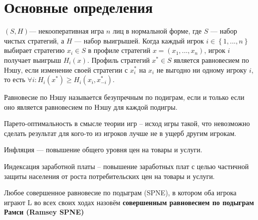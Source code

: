 \section{Основные определения}

\begin{definition}	$(S,H)$— некооперативная игра $n$ лиц в нормальной форме, где $S$ — набор чистых стратегий, а $H$ — набор выигрышей. Когда каждый игрок $i \in \left\{1,...,n\right\}$  выбирает стратегию $x_i \in S$  в профиле стратегий $x=(x_1,...,x_n)$, игрок $i$  получает выигрыш $H_i(x)$. Профиль стратегий $x^* \in S$   является равновесием по Нэшу, если изменение своей стратегии с $x_i^*$  на $x_i$  не выгодно ни одному игроку $i$, то есть $\forall i : H_i(x^*) \ge H_i(x_i, x_{-i}^*)$.
\end{definition}
	
\begin{definition}
Равновесие по Нэшу называется безупречным по подиграм, если и только если оно является равновесием по Нэшу для каждой подигры.
\end{definition}

\begin{definition}
Парето-оптимальность в смысле теории игр – исход игры такой, что невозможно сделать результат для кого-то из игроков лучше не в ущерб другим игрокам. 
\end{definition}

\begin{definition}
	Инфляция  — повышение общего уровня цен на товары и услуги.
\end{definition}

\begin{definition}
	Индексация заработной платы – повышение заработных плат с целью частичной защиты населения от роста потребительских цен на товары и услуги.
\end{definition}

\begin{definition}
	Любое совершенное равновесие по подыграм (SPNE), в котором оба игрока играют L во всех своих ходах назовём \textbf{совершенным равновесием по подыграм Рамси (Ramsey SPNE)}
\end{definition}
